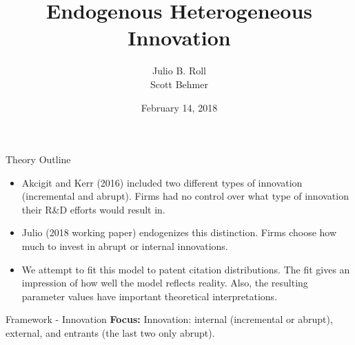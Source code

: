 \documentclass[11pt]{beamer}
\author{Julio B. Roll \\ Scott Behmer}
\title{Endogenous Heterogeneous Innovation}
\date{February 14, 2018}
\begin{document}
\begin{frame}
	\maketitle
\end{frame}

\begin{frame}{Theory Outline}
	\begin{itemize}\itemsep12pt
	\item Akcigit and Kerr (2016) included two different types of innovation (incremental and abrupt). Firms had no control over what type of innovation their R\&D efforts would result in.
	\item Julio (2018 working paper) endogenizes this distinction. Firms choose how much to invest in abrupt or internal innovations.
	\item We attempt to fit this model to patent citation distributions. The fit gives an impression of how well the model reflects reality. Also, the resulting parameter values have important theoretical interpretations.
	\end{itemize}
\end{frame}

\begin{frame}{Framework - Innovation}
	\textbf{Focus:} Innovation: internal (incremental or abrupt), external, and entrants (the last two only abrupt).
	\begin{center}
	\begin{figure}\centering\label{Innov5}
	\end{figure}
	\end{center}
\end{frame}
\end{document}
